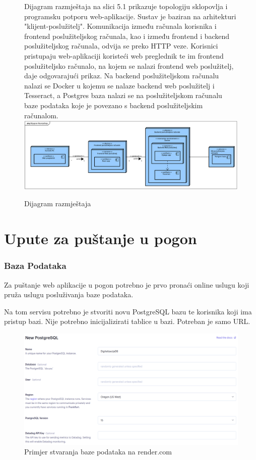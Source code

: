 			\begin{figure}[H]
				Dijagram razmještaja na slici 5.1 prikazuje topologiju sklopovlja i programsku potporu web-aplikacije. Sustav je baziran na arhitekturi
				"klijent-poslužitelj". Komunikacija između računala korisnika i frontend poslužiteljskog računala, kao i između frontend i backend poslužiteljskog
				računala, odvija se preko HTTP veze. Korisnici pristupaju web-aplikaciji koristeći web preglednik te im frontend poslužiteljsko računalo, na kojem
				se nalazi frontend web poslužitelj, daje odgovarajući prikaz. Na backend poslužiteljskom računalu nalazi se Docker u kojemu se nalaze backend web
				poslužitelj i Tesseract, a Postgres baza nalazi se na poslužiteljskom računalu baze podataka koje je povezano s backend poslužiteljskim računalom.
				\newline
				\includegraphics[width=\textwidth]{slike/Deployment.png}
				\caption{Dijagram razmještaja}
				\label{fig:Deployment}
			\end{figure}
			\eject 
		
		\section{Upute za puštanje u pogon}
		
			\subsubsection{Baza Podataka}

			Za puštanje web aplikacije u pogon potrebno je prvo pronaći online uslugu koji pruža uslugu posluživanja baze podataka.

			Na tom servisu potrebno je stvoriti novu PostgreSQL bazu te korisnika koji ima pristup bazi. Nije potrebno inicijalizirati
			tablice u bazi. Potreban je samo URL.

			\begin{figure}[H]
				\includegraphics[width=\textwidth]{slike/creatingDB.png}
				\caption{Primjer stvaranja baze podataka na render.com}
				\label{fig:stvaranje_baze}
			\end{figure}


